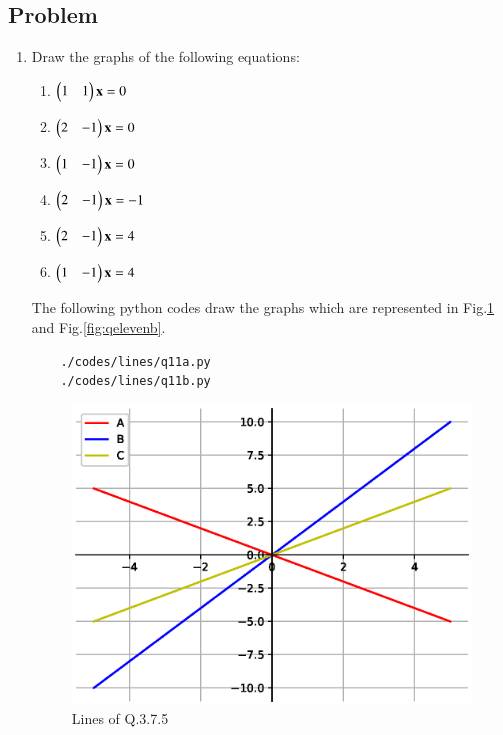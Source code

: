 \subsection{Problem}

\renewcommand{\theequation}{\theenumi}
\begin{enumerate}[label=\thesection.\arabic*.,ref=\thesection.\theenumi]
	\item Draw the graphs of the following equations:
	\begin{enumerate}
		\item $\begin{pmatrix}1&1\end{pmatrix}\mathbf{x}=0$	
		\item $\begin{pmatrix}2&-1\end{pmatrix}\mathbf{x}=0$
		\item $\begin{pmatrix}1&-1\end{pmatrix}\mathbf{x}=0$
		\item $\begin{pmatrix}2&-1\end{pmatrix}\mathbf{x}=-1$
		\item $\begin{pmatrix}2&-1\end{pmatrix}\mathbf{x}=4$
		\item $\begin{pmatrix}1&-1\end{pmatrix}\mathbf{x}=4$
	\end{enumerate}
	The following python codes draw the graphs which are represented in Fig.\ref{fig:qelevena} and Fig.\ref{fig:qelevenb}.
	\begin{lstlisting}
	./codes/lines/q11a.py
	./codes/lines/q11b.py
	\end{lstlisting}
	\solution
	\begin{figure}[!ht]
	\centering
	\includegraphics[width=\columnwidth]{./figs/lines/q11a.eps}
	\caption{Lines of Q.3.7.5}
	\label{fig:qelevena}	
	\end{figure}
	\begin{figure}[!ht]
	\centering

\end{figure}
\end{enumerate}
